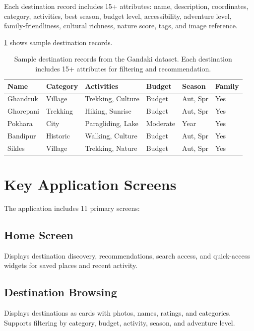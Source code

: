 \documentclass[12pt,a4paper,oneside]{report}
\begin{document}
Each destination record includes 15+ attributes: name, description, coordinates, category, activities, best season, budget level, accessibility, adventure level, family-friendliness, cultural richness, nature score, tags, and image reference.

\cref{tbl:sample_destinations} shows sample destination records.

\begin{table}[h]
\centering
\small
\begin{tabular}{llllll}
\toprule
\textbf{Name} & \textbf{Category} & \textbf{Activities} & \textbf{Budget} & \textbf{Season} & \textbf{Family} \\
\midrule
Ghandruk & Village & Trekking, Culture & Budget & Aut, Spr & Yes \\
Ghorepani & Trekking & Hiking, Sunrise & Budget & Aut, Spr & Yes \\
Pokhara & City & Paragliding, Lake & Moderate & Year & Yes \\
Bandipur & Historic & Walking, Culture & Budget & Aut, Spr & Yes \\
Sikles & Village & Trekking, Nature & Budget & Aut, Spr & Yes \\
\bottomrule
\end{tabular}
\caption{Sample destination records from the Gandaki dataset. Each destination includes 15+ attributes for filtering and recommendation.}
\label{tbl:sample_destinations}
\end{table}

\section{Key Application Screens}
\label{sec:screens}

The application includes 11 primary screens:

\subsection{Home Screen}

Displays destination discovery, recommendations, search access, and quick-access widgets for saved places and recent activity.

\subsection{Destination Browsing}

Displays destinations as cards with photos, names, ratings, and categories. Supports filtering by category, budget, activity, season, and adventure level.
\end{document}
